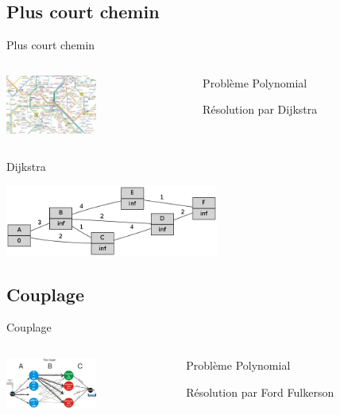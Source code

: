 \documentclass[xcolor=dvipsnames]{beamer}
\begin{document}
	\subsection{Plus court chemin}
		\begin{frame}{Plus court chemin}
        \begin{columns}
            \begin{column}{0cm}
                \includegraphics[width=3cm]{images/metro.jpg}
            \end{column}
            \begin{column}{8cm}
                \begin{description}\itemsep15pt
                    \item Problème Polynomial
                    \item Résolution par Dijkstra
                \end{description}
            \end{column}
        \end{columns}
	\end{frame}
		\begin{frame}{Dijkstra}
	  \begin{center}
                \includegraphics[width=7cm]{images/dot1.png}
	  \end{center}
    \end{frame}
	\subsection{Couplage}
		\begin{frame}{Couplage}
           \begin{columns}
            \begin{column}{0cm}
                \includegraphics[width=3cm]{images/exemple_couplage.png}
            \end{column}
            \begin{column}{8cm}
                \begin{description}\itemsep15pt
                    \item Problème Polynomial
                    \item Résolution par Ford Fulkerson
                \end{description}
            \end{column}
        \end{columns}
		\end{frame}
\end{document}
